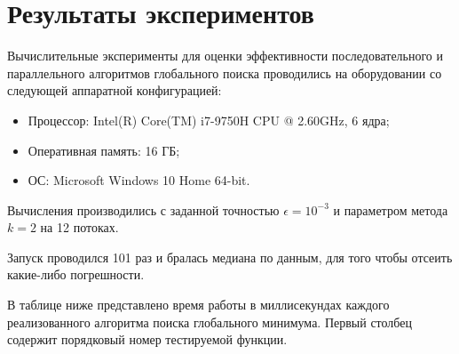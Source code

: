 \documentclass{report}
\begin{document}
\section*{Результаты экспериментов}

Вычислительные эксперименты для оценки эффективности последовательного и параллельного алгоритмов глобального поиска проводились на оборудовании со следующей аппаратной конфигурацией:

\begin{itemize}
    \item Процессор: Intel(R) Core(TM) i7-9750H CPU @ 2.60GHz, 6 ядра;
    \item Оперативная память: 16 ГБ;
    \item ОС: Microsoft Windows 10 Home 64-bit.
\end{itemize}

Вычисления производились с заданной точностью $\epsilon = 10^{-3}$ и параметром метода  $k = 2$ на 12 потоках.

Запуск проводился 101 раз и бралась медиана по данным, для того чтобы отсеить какие-либо погрешности.

В таблице ниже представлено время работы в миллисекундах каждого реализованного алгоритма поиска глобального минимума. Первый столбец содержит порядковый номер тестируемой функции.
\end{document}
